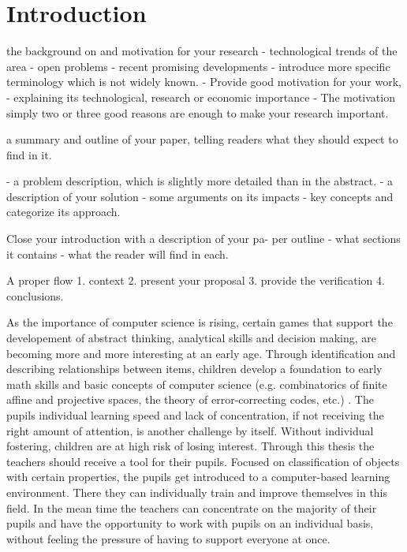 
\setcounter{chapter}{0}

\chapter{Introduction}
\label{chap:introduction}

the background on and motivation for your research
- technological trends of the area
- open problems
- recent promising developments
- introduce more specific terminology which is not widely known.
- Provide good motivation for your work,
- explaining its technological, research or economic importance
- The motivation simply two or three good reasons are enough to
make your research important.

a summary and outline of your paper, telling readers what they should expect to find in it.

- a problem description, which is slightly more detailed than in the abstract.
- a description of your solution
- some arguments on its impacts
- key concepts and categorize its approach.

Close your introduction with a description of your pa-
per outline
- what sections it contains
- what the reader will find in each.

A proper flow
1. context
2. present your proposal
3. provide the verification
4. conclusions.

As the importance of computer science is rising, certain games that support the
developement of abstract thinking, analytical skills and decision making, are
becoming more and more interesting at an early age. Through identification and
describing relationships between items, children develop a foundation to early
math skills and basic concepts of computer science (e.g. combinatorics of finite
affine and projective spaces, the theory of error-correcting codes, etc.)
. The pupils individual learning speed and lack of concentration, if
not receiving the right amount of attention, is another challenge by itself.
Without individual fostering, children are at high risk of losing interest.
Through this thesis the teachers should receive a tool for their pupils. Focused
on classification of objects with certain properties, the pupils get introduced
to a computer-based learning environment. There they can individually train and
improve themselves in this field. In the mean time the teachers can concentrate
on the majority of their pupils and have the opportunity to work with pupils on
an individual basis, without feeling the pressure of having to support everyone
at once.

